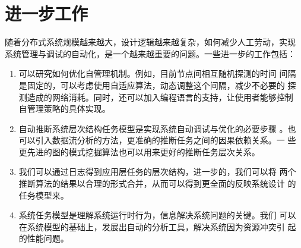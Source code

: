 \section{进一步工作}

随着分布式系统规模越来越大，设计逻辑越来越复杂，如何减少人工劳动，实现
系统管理与调试的自动化，是一个越来越重要的问题。一些进一步的工作包括：

\begin{enumerate}

  \item 可以研究如何优化自管理机制。例如，目前节点间相互随机探测的时间
  间隔是固定的，可以考虑使用自适应算法，动态调整这个间隔，减少不必要的
  探测造成的网络消耗。同时，还可以加入编程语言的支持，让使用者能够控制
  自管理策略的具体实现。

  \item 自动推断系统层次结构任务模型是实现系统自动调试与优化的必要步骤
  。也可以引入数据流分析的方法，更准确的推断任务之间的因果依赖关系。一
  些更先进的图的模式挖掘算法也可以用来更好的推断任务层次关系。
  
  \item 我们可以通过日志得到应用层任务的层次结构，进一步的，我们可以将
  两个推断算法的结果以合理的形式合并，从而可以得到更全面的反映系统设计
  的任务模型来。

  \item 系统任务模型是理解系统运行时行为，信息解决系统问题的关键。我们
  可以在系统模型的基础上，发展出自动的分析工具，解决系统因为资源冲突引
  起的性能问题。
  
\end{enumerate}
